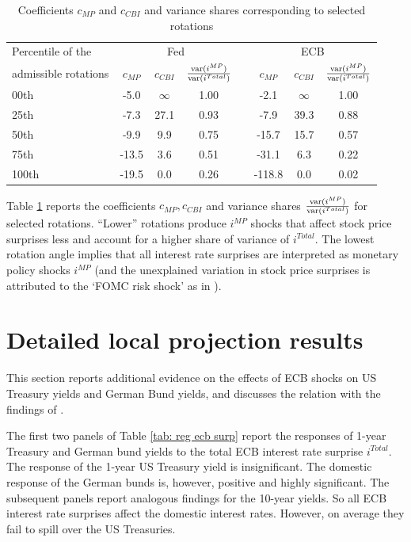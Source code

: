 \documentclass[a4paper,12pt]{article}
\begin{document}
\begin{table}[!htbp]
\begin{center}
\caption{Coefficients $c_{MP}$ and $c_{CBI}$ and variance shares corresponding to selected rotations}\label{tab: rotations}
\begin{tabular}{lccccccc}
\toprule
Percentile of the   & \multicolumn{3}{c}{Fed} & & \multicolumn{3}{c}{ECB}  \\
admissible rotations & $c_{MP}$ & $c_{CBI}$ & $\frac{\operatorname{var}(i^{MP})}{\operatorname{var}(i^{Total})}$ & & $c_{MP}$ & $c_{CBI}$ & $\frac{\operatorname{var}(i^{MP})}{\operatorname{var}(i^{Total})}$\\
\midrule
00th & -5.0 & $\infty$ & 1.00 &   & -2.1 & $\infty$ & 1.00 \\
25th & -7.3 & 27.1 & 0.93 &   & -7.9 & 39.3 & 0.88 \\
50th & -9.9 & 9.9 & 0.75 &   &-15.7 & 15.7 & 0.57 \\
75th & -13.5 & 3.6 & 0.51 &   &-31.1 & 6.3 & 0.22 \\
100th & -19.5 & 0.0 & 0.26 &   & -118.8 & 0.0 & 0.02 \\
\bottomrule
\end{tabular}
\end{center}
\end{table}

Table \ref{tab: rotations} reports the coefficients $c_{MP},c_{CBI}$ and variance shares $\frac{\operatorname{var}(i^{MP})}{\operatorname{var}(i^{Total})}$ for selected rotations. 
 ``Lower'' rotations produce $i^{MP}$ shocks that affect stock price surprises less and account for a higher share of variance of $i^{Total}$.
The lowest rotation angle implies that all interest rate surprises are interpreted as monetary policy shocks $i^{MP}$ (and the unexplained variation in stock price surprises is attributed to the `FOMC risk shock' as in \citealt{Kroencke_etal_2021}).

\clearpage

\section{Detailed local projection results}

This section reports additional evidence on the effects of ECB shocks on US Treasury yields and German Bund yields, and discusses the relation with the findings of \cite{Curcuru_etal_2018}.

The first two panels of Table \ref{tab: reg ecb surp} report the responses of 1-year Treasury and German bund yields to the total ECB interest rate surprise $i^{Total}$. 
The response of the 1-year US Treasury yield is insignificant.
The domestic response of the German bunds is, however, positive and highly significant.
The subsequent panels report analogous findings for the 10-year yields.
So all ECB interest rate surprises affect the domestic interest rates.
However, on average they fail to spill over the US Treasuries.
\end{document}
